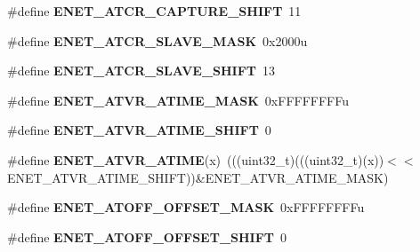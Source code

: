\begin{DoxyCompactItemize}
\item 
\#define {\bfseries E\+N\+E\+T\+\_\+\+A\+T\+C\+R\+\_\+\+C\+A\+P\+T\+U\+R\+E\+\_\+\+S\+H\+I\+FT}~11\hypertarget{group__ENET__Register__Masks_gad427aa0f3d7b6595aaf79996904fe1ff}{}\label{group__ENET__Register__Masks_gad427aa0f3d7b6595aaf79996904fe1ff}

\item 
\#define {\bfseries E\+N\+E\+T\+\_\+\+A\+T\+C\+R\+\_\+\+S\+L\+A\+V\+E\+\_\+\+M\+A\+SK}~0x2000u\hypertarget{group__ENET__Register__Masks_ga183333c88147503540c9c79d092d5799}{}\label{group__ENET__Register__Masks_ga183333c88147503540c9c79d092d5799}

\item 
\#define {\bfseries E\+N\+E\+T\+\_\+\+A\+T\+C\+R\+\_\+\+S\+L\+A\+V\+E\+\_\+\+S\+H\+I\+FT}~13\hypertarget{group__ENET__Register__Masks_gac12640c8f8383b91eafd801f7d13f218}{}\label{group__ENET__Register__Masks_gac12640c8f8383b91eafd801f7d13f218}

\item 
\#define {\bfseries E\+N\+E\+T\+\_\+\+A\+T\+V\+R\+\_\+\+A\+T\+I\+M\+E\+\_\+\+M\+A\+SK}~0x\+F\+F\+F\+F\+F\+F\+F\+Fu\hypertarget{group__ENET__Register__Masks_ga2714eeb8f8fc55584ae1f08903279268}{}\label{group__ENET__Register__Masks_ga2714eeb8f8fc55584ae1f08903279268}

\item 
\#define {\bfseries E\+N\+E\+T\+\_\+\+A\+T\+V\+R\+\_\+\+A\+T\+I\+M\+E\+\_\+\+S\+H\+I\+FT}~0\hypertarget{group__ENET__Register__Masks_gaf39338513eb4396791bd615bac83c136}{}\label{group__ENET__Register__Masks_gaf39338513eb4396791bd615bac83c136}

\item 
\#define {\bfseries E\+N\+E\+T\+\_\+\+A\+T\+V\+R\+\_\+\+A\+T\+I\+ME}(x)~(((uint32\+\_\+t)(((uint32\+\_\+t)(x))$<$$<$E\+N\+E\+T\+\_\+\+A\+T\+V\+R\+\_\+\+A\+T\+I\+M\+E\+\_\+\+S\+H\+I\+FT))\&E\+N\+E\+T\+\_\+\+A\+T\+V\+R\+\_\+\+A\+T\+I\+M\+E\+\_\+\+M\+A\+SK)\hypertarget{group__ENET__Register__Masks_gaccf108190376691ed3da804f145e3371}{}\label{group__ENET__Register__Masks_gaccf108190376691ed3da804f145e3371}

\item 
\#define {\bfseries E\+N\+E\+T\+\_\+\+A\+T\+O\+F\+F\+\_\+\+O\+F\+F\+S\+E\+T\+\_\+\+M\+A\+SK}~0x\+F\+F\+F\+F\+F\+F\+F\+Fu\hypertarget{group__ENET__Register__Masks_ga71beb7d6b82e503c872b4ca86033742d}{}\label{group__ENET__Register__Masks_ga71beb7d6b82e503c872b4ca86033742d}

\item 
\#define {\bfseries E\+N\+E\+T\+\_\+\+A\+T\+O\+F\+F\+\_\+\+O\+F\+F\+S\+E\+T\+\_\+\+S\+H\+I\+FT}~0\hypertarget{group__ENET__Register__Masks_ga6ee3bf7413489ccf980bb573591e692e}{}\label{group__ENET__Register__Masks_ga6ee3bf7413489ccf980bb573591e692e}


\end{DoxyCompactItemize}
